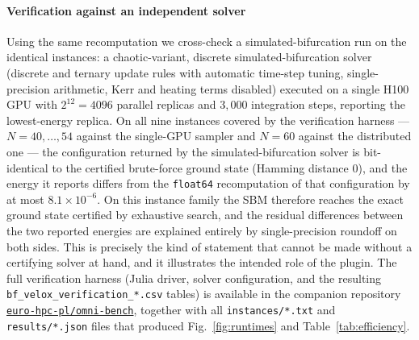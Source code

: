 \documentclass[preprint,12pt,a4paper]{elsarticle}
\newcommand{\datarepo}{https://github.com/euro-hpc-pl/omni-bench}
\newcommand{\datareponame}{\texttt{euro-hpc-pl/omni-bench}}
\begin{document}
\paragraph{Verification against an independent solver}
Using the same recomputation we cross-check a simulated-bifurcation run on the
identical instances: a chaotic-variant, discrete simulated-bifurcation solver
(discrete and ternary update rules with automatic time-step tuning,
single-precision arithmetic, Kerr and heating terms disabled) executed on a
single H100 GPU with $2^{12}=4096$ parallel replicas and $3{,}000$ integration
steps, reporting the lowest-energy replica. On all nine instances covered by the
verification harness --- $N=40,\dots,54$ against the single-GPU sampler and
$N=60$ against the distributed one --- the configuration returned by the
simulated-bifurcation solver is bit-identical to the certified brute-force ground
state (Hamming distance $0$), and the energy it reports differs from the
\texttt{float64} recomputation of that configuration by at most $8.1\times
10^{-6}$. On this instance family the SBM therefore reaches the exact ground
state certified by exhaustive search, and the residual differences between the
two reported energies are explained entirely by single-precision roundoff on both
sides. This is precisely the kind of statement that cannot be made without a
certifying solver at hand, and it illustrates the intended role of the plugin.
The full verification harness (Julia driver, solver configuration, and the
resulting \texttt{bf\_velox\_verification\_*.csv} tables) is available in the
companion repository \href{\datarepo}{\datareponame}, together with all
\texttt{instances/*.txt} and \texttt{results/*.json} files that produced
Fig.~\ref{fig:runtimes} and Table~\ref{tab:efficiency}.
\end{document}
